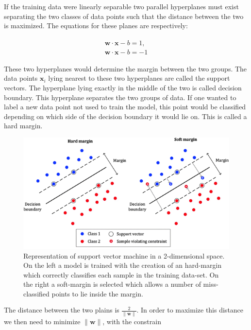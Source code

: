 If the training data were linearly separable two parallel hyperplanes must exist separating the two classes of data points such that the distance between the two is maximized. The equations for these planes are respectively:

\begin{align}
\label{eq:planes1}
	\begin{split}
	\mathbf {w}\cdot \mathbf {x}-b = 1, \\
	\mathbf {w}\cdot \mathbf {x}-b = -1
	\end{split}
\end{align}

These two hyperplanes would determine the margin between the two groups. The data points ${\mathbf {x}}_{i}$ lying nearest to these two hyperplanes are called the support vectors. The hyperplane lying exactly in the middle of the two is called decision boundary. This hyperplane separates the two groups of data. If one wanted to label a new data point not used to train the model, this point would be classified depending on which side of the decision boundary it would lie on. This is called a hard margin.

\begin{figure}[!tp]
	\centering		  
	\includegraphics[width=1.\textwidth]{figures/SVM.png}
	\caption{Representation of support vector machine in a 2-dimensional space. On the left a model is trained with the creation of an hard-margin which correctly classifies each sample in the training data-set. On the right a soft-margin is selected which allows a number of miss-classified points to lie inside the margin.}
	\label{fig:svm}
\end{figure}

The distance between the two plains is ${\frac {2}{\|{\mathbf {w}}\|}}$. In order to maximize this distance we then need to minimize $\|{\mathbf {w}}\|$, with the constrain

